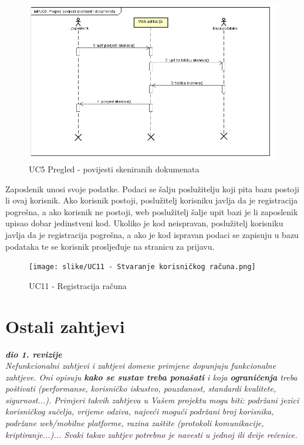 		\begin{figure}[H]
			\includegraphics[scale=0.8]{slike/UC5 - Pregled povijesti skeniranih dokumenata.png} %
			\centering
			\caption{UC5 Pregled - povijesti skeniranih dokumenata}
			\label{uc5}
		\end{figure}
	
		\pagebreak
		Zaposlenik unosi svoje podatke. Podaci se šalju poslužitelju koji pita bazu postoji li ovaj korisnik. Ako korisnik postoji, poslužitelj korisniku javlja da je registracija pogrešna, a ako korisnik ne postoji, web poslužitelj šalje upit bazi je li zaposlenik upisao dobar jedinstveni kod. Ukoliko je kod neispravan, poslužitelj korisniku javlja da je registracija pogrešna, a ako je kod ispravan podaci se zapisuju u bazu podataka te se korisnik prosljeđuje na stranicu za prijavu.
		\begin{figure}[H]
			\texttt{[image: slike/UC11 - Stvaranje korisničkog računa.png]} %
			\centering
			\caption{UC11 -  Registracija računa}
			\label{uc5}
		\end{figure}
	
		\section{Ostali zahtjevi}
		
			\textbf{\textit{dio 1. revizije}}\\
		 
			 \textit{Nefunkcionalni zahtjevi i zahtjevi domene primjene dopunjuju funkcionalne zahtjeve. Oni opisuju \textbf{kako se sustav treba ponašati} i koja \textbf{ograničenja} treba poštivati (performanse, korisničko iskustvo, pouzdanost, standardi kvalitete, sigurnost...). Primjeri takvih zahtjeva u Vašem projektu mogu biti: podržani jezici korisničkog sučelja, vrijeme odziva, najveći mogući podržani broj korisnika, podržane web/mobilne platforme, razina zaštite (protokoli komunikacije, kriptiranje...)... Svaki takav zahtjev potrebno je navesti u jednoj ili dvije rečenice.}
			 
			 
			 
	